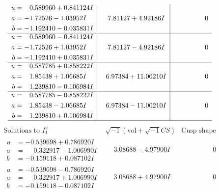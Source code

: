 \documentclass[1p]{elsarticle_modified}
\theoremstyle{definition}
\newcommand{\I}{\sqrt{-1}}
\begin{document}
$$\begin{array}{c|c|c}
\begin{aligned}
u &= \phantom{-}0.589960 + 0.841124 I \\
a &= -1.72526 - 1.03952 I \\
b &= -1.192410 - 0.035831 I\end{aligned}
 & \phantom{-}7.81127 + 4.92186 I & \phantom{-0.000000 } 0 \\ \hline\begin{aligned}
u &= \phantom{-}0.589960 - 0.841124 I \\
a &= -1.72526 + 1.03952 I \\
b &= -1.192410 + 0.035831 I\end{aligned}
 & \phantom{-}7.81127 - 4.92186 I & \phantom{-0.000000 } 0 \\ \hline\begin{aligned}
u &= \phantom{-}0.587785 + 0.858222 I \\
a &= \phantom{-}1.85438 + 1.06685 I \\
b &= \phantom{-}1.239810 - 0.106984 I\end{aligned}
 & \phantom{-}6.97384 + 11.00210 I & \phantom{-0.000000 } 0 \\ \hline\begin{aligned}
u &= \phantom{-}0.587785 - 0.858222 I \\
a &= \phantom{-}1.85438 - 1.06685 I \\
b &= \phantom{-}1.239810 + 0.106984 I\end{aligned}
 & \phantom{-}6.97384 - 11.00210 I & \phantom{-0.000000 } 0\\
 \hline 
 \end{array}$$\newpage$$\begin{array}{c|c|c}  
\text{Solutions to }I^u_{1}& \I (\text{vol} + \sqrt{-1}CS) & \text{Cusp shape}\\
 \hline 
\begin{aligned}
u &= -0.539698 + 0.786920 I \\
a &= \phantom{-}0.322917 - 1.006990 I \\
b &= -0.159118 + 0.087102 I\end{aligned}
 & \phantom{-}3.08688 - 4.97900 I & \phantom{-0.000000 } 0 \\ \hline\begin{aligned}
u &= -0.539698 - 0.786920 I \\
a &= \phantom{-}0.322917 + 1.006990 I \\
b &= -0.159118 - 0.087102 I\end{aligned}
 & \phantom{-}3.08688 + 4.97900 I & \phantom{-0.000000 } 0 \\ \hline\begin{aligned}

\end{aligned}
\end{array}$$
\end{document}
